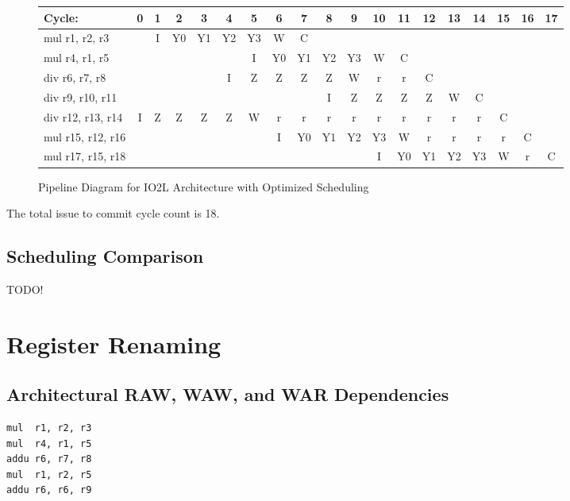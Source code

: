 \documentclass[10pt]{article}
\begin{document}
\begin{figure}[H]
\centering
{\setlength{\tabcolsep}{2pt}
\begin{tabular}{|l!{\vrule width 1.5pt}c|c|c|c|c|c|c|c|c|c|c|c|c|c|c|c|c|c!{\vrule width 1.5pt}}
\hline
Cycle:            & 0 & 1 & 2 & 3 & 4 & 5 & 6 & 7 & 8 & 9 & 10 & 11 & 12 & 13 & 14 & 15 & 16 & 17 \\ \hline
mul r1, r2, r3    &   & I & Y0& Y1& Y2& Y3& W & C &   &   &    &    &    &    &    &    &    &    \\ \hline
mul r4, r1, r5    &   &   &   &   &   & I & Y0& Y1& Y2& Y3& W  & C  &    &    &    &    &    &    \\ \hline
div r6, r7, r8    &   &   &   &   & I & Z & Z & Z & Z & W & r  & r  & C  &    &    &    &    &    \\ \hline
div r9, r10, r11  &   &   &   &   &   &   &   &   & I & Z & Z  & Z  & Z  & W  & C  &    &    &    \\ \hline
div r12, r13, r14 & I & Z & Z & Z & Z & W & r & r & r & r & r  & r  & r  & r  & r  & C  &    &    \\ \hline
mul r15, r12, r16 &   &   &   &   &   &   & I & Y0& Y1& Y2& Y3 & W  & r  & r  & r  & r  & C  &    \\ \hline
mul r17, r15, r18 &   &   &   &   &   &   &   &   &   &   & I  & Y0 & Y1 & Y2 & Y3 & W  & r  & C  \\ \hline
\end{tabular}
}
\caption{Pipeline Diagram for IO2L Architecture with Optimized Scheduling}
\end{figure}

The total issue to commit cycle count is 18.

\subsection{Scheduling Comparison}

TODO!

\cleardoublepage
\section{Register Renaming}

\subsection{Architectural RAW, WAW, and WAR Dependencies}

\begin{lstlisting}
mul  r1, r2, r3
mul  r4, r1, r5
addu r6, r7, r8
mul  r1, r2, r5
addu r6, r6, r9
\end{lstlisting}
\end{document}
